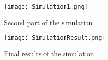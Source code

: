 \begin{figure}[h]
	\centering
	\captionsetup{justification=centering}
	\texttt{[image: Simulation1.png]}	
	\caption{Second part of the simulation}
\end{figure}
\begin{figure}[h]
	\centering
	\captionsetup{justification=centering}
	\texttt{[image: SimulationResult.png]}	
	\caption{Final results of the simulation}
	\label{simRes}
\end{figure}





\clearpage